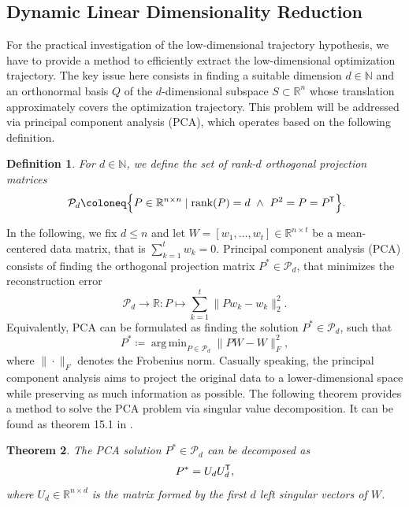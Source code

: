\documentclass[11pt, a4paper]{article}
\newtheorem{theorem}{Theorem}[section]
\newtheorem{definition}[theorem]{Definition}
\newcommand{\N}{\mathbb{N}}
\newcommand{\R}{\mathbb{R}}
\renewcommand{\P}{\mathcal{P}}
\newcommand*{\tr}{^{\mkern-1.5mu\mathsf{T}}}
\DeclareMathOperator*{\argmin}{arg\,min}
\begin{document}
\subsection{Dynamic Linear Dimensionality Reduction} \label{sec:DLDR}

For the practical investigation of the low-dimensional trajectory hypothesis, we have to provide a method to efficiently extract the low-dimensional optimization trajectory. The key issue here consists in finding a suitable dimension $d \in \N$ and an orthonormal basis $Q$ of the $d$-dimensional subspace $S \subset \R^n$ whose translation approximately covers the optimization trajectory. This problem will be addressed via principal component analysis (PCA), which operates based on the following definition.

\begin{definition}
For $d \in \N$, we define the set of rank-$d$ orthogonal projection matrices
\[ \P_d \coloneq \Big \{ P \in \R^{n \times n} \mid \text{rank}(P) = d \ \wedge \ P^2 = P = P\tr  \Big \}. \]
\end{definition}

In the following, we fix $d \leq n$ and let $W = [w_1, \dots, w_t] \in \R^{n \times t}$ be a mean-centered data matrix, that is $\sum_{k=1}^{t}w_k=0$. Principal component analysis (PCA) consists of finding the orthogonal projection matrix $P^* \in \P_d$, that minimizes the reconstruction error
\[ \P_d \to \R : P \mapsto \sum_{k=1}^{t} \big \| Pw_k - w_k \big \|_2^2. \]
Equivalently, PCA can be formulated as finding the solution $P^* \in \P_d$, such that
\[ P^* \coloneq \argmin_{P \in \P_d} \big \| PW - W \big \|_F^2, \]
where $\| \cdot \|_F$ denotes the Frobenius norm. Casually speaking, the principal component analysis aims to project the original data to a lower-dimensional space while preserving as much information as possible. The following theorem provides a method to solve the PCA problem via singular value decomposition. It can be found as theorem 15.1 in \cite{PCA}.

\begin{theorem} \label{thm:pca}
The PCA solution $P^* \in \P_d$ can be decomposed as
\[ P^* = U_dU_d\tr , \]
where $U_d \in \R^{n \times d}$ is the matrix formed by the first $d$ left singular vectors of $W$.
\end{theorem}
\end{document}
